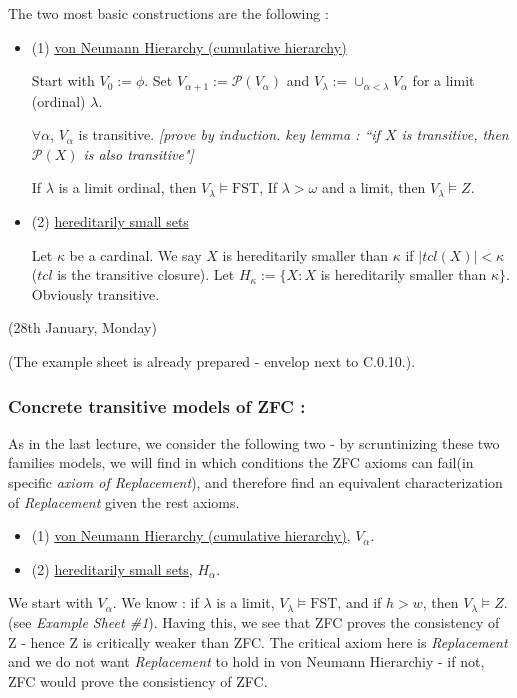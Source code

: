 \documentclass[12pt,a4paper]{article}
\renewenvironment{i}
{\begin{itemize} 
	}%
	{\end{itemize}
}
\begin{document}
\quad The two most basic constructions are the following :
\begin{i}
\item[(1)] \underline{von Neumann Hierarchy (cumulative hierarchy)}

Start with $V_0 := \phi$. Set $V_{\alpha+1} := \mathscr{P}(V_{\alpha})$ and $V_{\lambda} := \cup_{\alpha< \lambda} V_{\alpha}$ for a limit (ordinal) $\lambda$.
\s

\prop $\forall \alpha$, $V_{\alpha}$ is transitive. \emph{[prove by induction. key lemma : ``if $X$ is transitive, then $\mathscr{P}(X)$ is also transitive"]}

If $\lambda$ is a limit ordinal, then $V_{\lambda} \models \text{FST}$, If $\lambda > \omega$ and a limit, then $V_{\lambda}\models Z$.

\item[(2)] \underline{hereditarily small sets}

Let $\kappa$ be a cardinal. We say $X$ is hereditarily smaller than $\kappa$ if $|tcl(X)| < \kappa$ ($tcl$ is the transitive closure). Let $H_{\kappa} := \{X:X$ is hereditarily smaller than $\kappa \}$. Obviously transitive.
\end{i}
\s

\newday

(28th January, Monday)
\s

(The example sheet is already prepared - envelop next to C.0.10.).

\s
\subsubsection*{Concrete transitive models of ZFC :}

As in the last lecture, we consider the following two - by scruntinizing these two families models, we will find in which conditions the ZFC axioms can fail(in specific \emph{axiom of Replacement}), and therefore find an equivalent characterization of \emph{Replacement} given the rest axioms.
\begin{i}
\item[(1)] \underline{von Neumann Hierarchy (cumulative hierarchy)}, $V_{\alpha}$.

\item[(2)] \underline{hereditarily small sets}, $H_{\alpha}$.
\end{i}
We start with $V_{\alpha}$. We know : if $\lambda$ is a limit, $V_{\lambda} \models \text{FST}$, and if $h>w$, then $V_{\lambda} \models Z$. (see \emph{Example Sheet \#1}). Having this, we see that ZFC proves the consistency of Z - hence Z is critically weaker than ZFC. The critical axiom here is \emph{Replacement} and we do not want \emph{Replacement} to hold in von Neumann Hierarchiy - if not, ZFC would prove the consistiency of ZFC.
\end{document}
